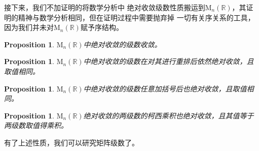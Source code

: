\documentclass[a4paper,12pt]{ctexart}
\newtheorem{prop}[defn]{Proposition}
\begin{document}
接下来，我们不加证明的将数学分析中
绝对收敛级数性质搬运到$\text{M}_n(\mathbb{R})$，其证明的精神与数学分析相同，但在证明过程中需要抛弃掉
一切有关序关系的工具，因为我们并未对$\text{M}_n(\mathbb{R})$赋予序结构。

\begin{prop}
    $\text{M}_n(\mathbb{R})$中绝对收敛的级数收敛。
\end{prop}
\begin{prop}
    $\text{M}_n(\mathbb{R})$中绝对收敛的级数在对其进行重排后依然绝对收敛，且取值相同。
\end{prop}
\begin{prop}
    $\text{M}_n(\mathbb{R})$中绝对收敛的级数任意加括号后也绝对收敛，且取值相同。
\end{prop}
\begin{prop}
    $\text{M}_n(\mathbb{R})$绝对收敛的两级数的柯西乘积也绝对收敛，且其值等于两级数取值得乘积。
\end{prop}
有了上述性质，我们可以研究矩阵级数了。
\end{document}

